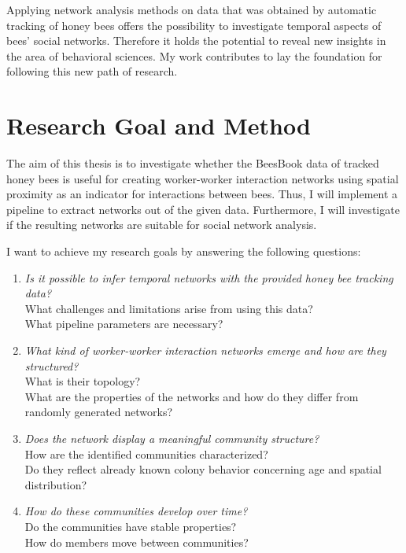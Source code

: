 Applying network analysis methods on data that was obtained by automatic tracking of honey bees offers the possibility to investigate temporal aspects of bees' social networks.
Therefore it holds the potential to reveal new insights in the area of behavioral sciences.
My work contributes to lay the foundation for following this new path of research.

\section{Research Goal and Method}
\label{sec:intro:goals}
The aim of this thesis is to investigate whether the BeesBook data of tracked honey bees is useful for creating worker-worker interaction networks using spatial proximity as an indicator for interactions between bees.
Thus, I will implement a pipeline to extract networks out of the given data. Furthermore, I will investigate if the resulting networks are suitable for social network analysis.

I want to achieve my research goals by answering the following questions:

\begin{enumerate}
\item \emph{Is it possible to infer temporal networks with the provided honey bee tracking data?}\\
What challenges and limitations arise from using this data?\\
What pipeline parameters are necessary?
\item \emph{What kind of worker-worker interaction networks emerge and how are they structured?}\\
What is their topology?\\
What are the properties of the networks and how do they differ from randomly generated networks?
\item \emph{Does the network display a meaningful community structure?}\\
How are the identified communities characterized?\\
Do they reflect already known colony behavior concerning age and spatial distribution?
\item \emph{How do these communities develop over time?}\\
Do the communities have stable properties?\\
How do members move between communities?
\end{enumerate}


